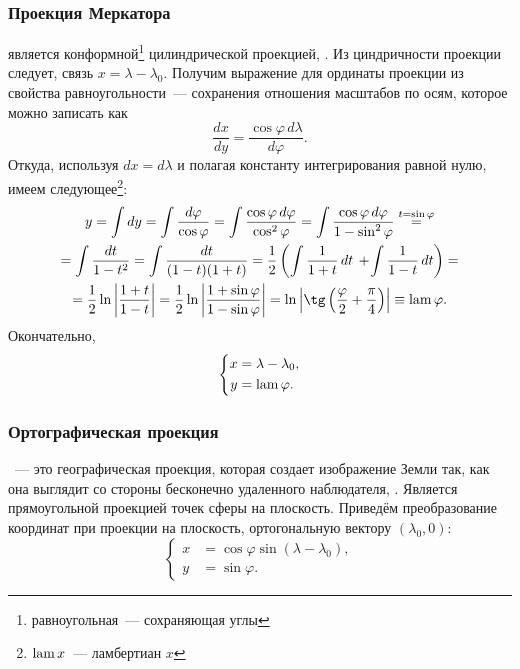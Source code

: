 \subsubsection{Проекция Меркатора}

 является конформной\footnote{равноугольная~--- сохраняющая углы} цилиндрической проекцией, . Из циндричности проекции следует, связь $x = \lambda - \lambda_0$. Получим выражение для ординаты проекции из свойства равноугольности~--- сохранения отношения масштабов по осям, которое можно записать как
\begin{equation}
    \frac{dx}{dy} = \frac{\cos \varphi \, d\lambda}{d \varphi}.
\end{equation}
Откуда, используя $dx = d \lambda$ и полагая константу интегрирования равной нулю, имеем следующее\footnote{$\operatorname{lam} x$~--- ламбертиан $x$}:
\begin{multline*}
    y 
        = \int dy 
        = \int \frac{d\varphi}{\cos \varphi }
        = \int \frac{\cos \varphi \,d\varphi }{\cos^2 \varphi}
        = \int \frac{\cos \varphi \, d\varphi }{1 - \sin^2 \varphi} \overset{t = \sin \varphi}{=} \\
        = \int \frac{dt}{1 - t^2} 
        = \int\frac{dt}{(1-t)(1+t)}
        = \frac{1}{2} \left( \int \frac{1}{1+t} \, dt \, + \! \int \frac{1}{1-t} \, dt \right) = \\
        = \frac{1}{2} \ln\left|\frac{1 + t}{1 - t}\right|
        = \dfrac{1}{2} \ln \left|\frac{1+\sin \varphi }{1 - \sin\varphi}\right|
        = \ln\left| \tg \left(\frac{\varphi}{2} + \frac{\pi}{4}\right) \right|
        \equiv \lam \varphi.
\end{multline*}
Окончательно,
\begin{equation}
    \left\{\begin{aligned}
        x &= \lambda - \lambda_0,\\
        y &= \operatorname{lam} \varphi.
    \end{aligned}\right.
\end{equation}

\subsubsection{Ортографическая проекция}

~--- это географическая проекция, которая создает изображение Земли так, как она выглядит со стороны бесконечно удаленного наблюдателя, . Является прямоугольной проекцией точек сферы на плоскость. Приведём преобразование координат при проекции на плоскость, ортогональную вектору $(\lambda_0, 0)$:
\begin{equation}
    \left\{\begin{aligned}
        x &= \cos \varphi \sin(\lambda - \lambda_0),\\
        y &= \sin \varphi.
    \end{aligned}\right.
\end{equation}

